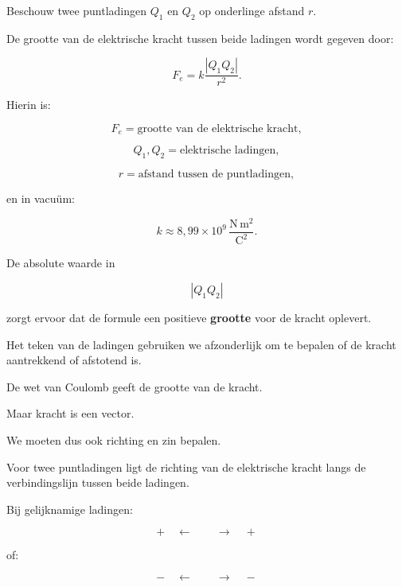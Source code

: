 \documentclass{ximera}
\begin{document}


Beschouw twee puntladingen $Q_1$ en $Q_2$ op onderlinge afstand $r$.

De grootte van de elektrische kracht tussen beide ladingen wordt
gegeven door:


\begin{definitie}

\[
\boxed{
F_e
=
k\frac{|Q_1Q_2|}{r^2}.
}
\]

Hierin is:

\[
F_e=\text{grootte van de elektrische kracht},
\]

\[
Q_1,Q_2=\text{elektrische ladingen},
\]

\[
r=\text{afstand tussen de puntladingen},
\]

en in vacuüm:

\[
\boxed{
k\approx8{,}99\times10^9\,
\frac{\mathrm{N\,m^2}}{\mathrm{C^2}}.
}
\]

\end{definitie}


De absolute waarde in

\[
|Q_1Q_2|
\]

zorgt ervoor dat de formule een positieve \textbf{grootte} voor de
kracht oplevert.

Het teken van de ladingen gebruiken we afzonderlijk om te bepalen of
de kracht aantrekkend of afstotend is.




De wet van Coulomb geeft de grootte van de kracht.

Maar kracht is een vector.

We moeten dus ook richting en zin bepalen.

Voor twee puntladingen ligt de richting van de elektrische kracht langs
de verbindingslijn tussen beide ladingen.


Bij gelijknamige ladingen:

\[
+\quad\longleftarrow
\qquad
\longrightarrow\quad+
\]

of:

\[
-\quad\longleftarrow
\qquad
\longrightarrow\quad-
\]
\end{document}

